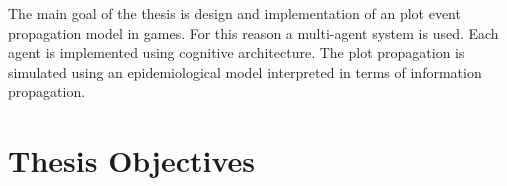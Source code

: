 The main goal of the thesis is design and implementation of an plot event propagation model in games.
For this reason a multi-agent system is used.
Each agent is implemented using cognitive architecture.
The plot propagation is simulated using an epidemiological model interpreted in terms of information propagation.




\section*{Thesis Objectives}

